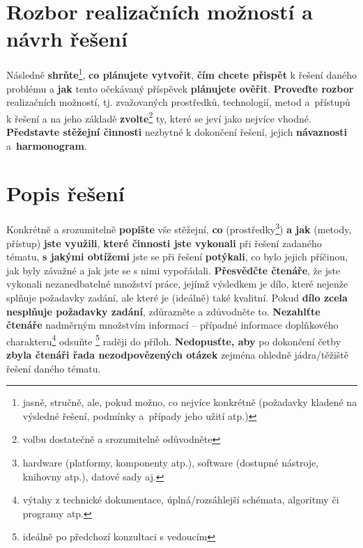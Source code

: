 \documentclass[a4paper,11pt, twoside]{report}
\begin{document}
\vspace{8mm}

\parbox{\textwidth}{
\centering

\scalebox{2.5}{
\faCogs
}
\vspace{-4mm}
}


\section{Rozbor realizačních možností a návrh řešení}

Následně \textbf{shrňte}\footnote{jasně, stručně, ale, pokud možno, co nejvíce konkrétně (požadavky kladené  na výsledné řešení, podmínky a~případy jeho užití atp.)}, \textbf{co plánujete vytvořit}, \textbf{čím chcete přispět} k řešení daného problému a \textbf{jak} 
tento očekávaný příspěvek \textbf{plánujete ověřit}. \textbf{Proveďte rozbor} realizačních možností, tj. 
zvažovaných prostředků, technologií, metod a~přístupů k řešení a na jeho základě \textbf{zvolte}\footnote{volbu dostatečně a srozumitelně odůvodněte} ty, které 
se jeví jako nejvíce vhodné. \textbf{Představte stěžejní činnosti} nezbytné k dokončení řešení,
jejich \textbf{návaznosti} a~\textbf{harmonogram}.

\vspace{8mm}

\parbox{\textwidth}{
\centering

\scalebox{2.5}{
\faPencil
}
\vspace{-8mm}
}



\section{Popis řešení}

Konkrétně a srozumitelně \textbf{popište} vše stěžejní, \textbf{co} (prostředky\footnote{hardware (platformy, komponenty atp.), software (dostupné nástroje, knihovny atp.), datové sady aj.}) \textbf{a jak} (metody, přístup) \textbf{jste využili}, \textbf{které činnosti jste vykonali} při řešení zadaného tématu, \textbf{s jakými obtížemi} jste se při řešení \textbf{potýkali}, co bylo jejich příčinou, jak byly závažné a jak jste se s nimi vypořádali.
\textbf{Přesvědčte čtenáře}, že jste vykonali nezanedbatelné množství práce, jejímž výsledkem je dílo, které nejenže splňuje požadavky zadání, ale které je (ideálně) také kvalitní. 
Pokud \textbf{dílo zcela nesplňuje požadavky zadání}, 
zdůrazněte a zdůvodněte to.
\textbf{Nezahlťte čtenáře} nadměrným množstvím informací -- případné informace doplňkového charakteru\footnote{výtahy z technické dokumentace, úplná/rozsáhlejší schémata, algoritmy či programy atp.} odsuňte \footnote{ideálně po předchozí konzultaci s vedoucím} 
raději
do příloh.
\textbf{Nedopusťte, aby} po dokončení četby \textbf{zbyla čtenáři řada nezodpovězených otázek} zejména ohledně jádra/těžiště řešení daného tématu.
\end{document}
